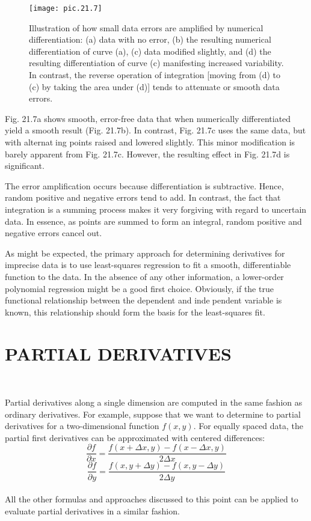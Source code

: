 \begin{figure}[hbt!]
	\centering
	\texttt{[image: pic.21.7]}
	\caption{\textsf{Illustration of how small data errors are amplified by numerical differentiation: (a) data with no
error, (b) the resulting numerical differentiation of curve (a), (c) data modified slightly, and (d) the
resulting differentiation of curve (c) manifesting increased variability. In contrast, the reverse
operation of integration [moving from (d) to (c) by taking the area under (d)] tends to attenuate 
or smooth data errors.}} \hline
	\label{pic.21.7}
\end{figure}

Fig. 21.7a shows smooth, error-free data that when numerically differentiated yield
a smooth result (Fig. 21.7b). In contrast, Fig. 21.7c uses the same data, but with alternating points raised and lowered slightly. This minor modification is barely apparent from
Fig. 21.7c. However, the resulting effect in Fig. 21.7d is significant.

The error amplification occurs because differentiation is subtractive. Hence, random
positive and negative errors tend to add. In contrast, the fact that integration is a summing
process makes it very forgiving with regard to uncertain data. In essence, as points are
summed to form an integral, random positive and negative errors cancel out.

As might be expected, the primary approach for determining derivatives for imprecise
data is to use least-squares regression to fit a smooth, differentiable function to the data. In
the absence of any other information, a lower-order polynomial regression might be a good
first choice. Obviously, if the true functional relationship between the dependent and independent variable is known, this relationship should form the basis for the least-squares fit.

\vspace{0,6in}
\chapter{PARTIAL DERIVATIVES}
\vspace{0,1in}
\hline\\
\vspace{0,1in}

Partial derivatives along a single dimension are computed in the same fashion as ordinary
derivatives. For example, suppose that we want to determine to partial derivatives for a
two-dimensional function $f (x, y)$. For equally spaced data, the partial first derivatives can be approximated with centered differences:
\begin{equation}
	\tag{21.22}
	\dfrac{\partial f}{\partial x} = \dfrac{f(x + \Delta x, y) - f(x- \Delta x, y)}{2\Delta x}
\end{equation}
\begin{equation}
	\tag{21.23}
	\dfrac{\partial f}{\partial y} = \dfrac{f(x,y+\Delta y) - f(x,y - \Delta y)}{2 \Delta y}
\end{equation}\\
All the other formulas and approaches discussed to this point can be applied to evaluate
partial derivatives in a similar fashion.

